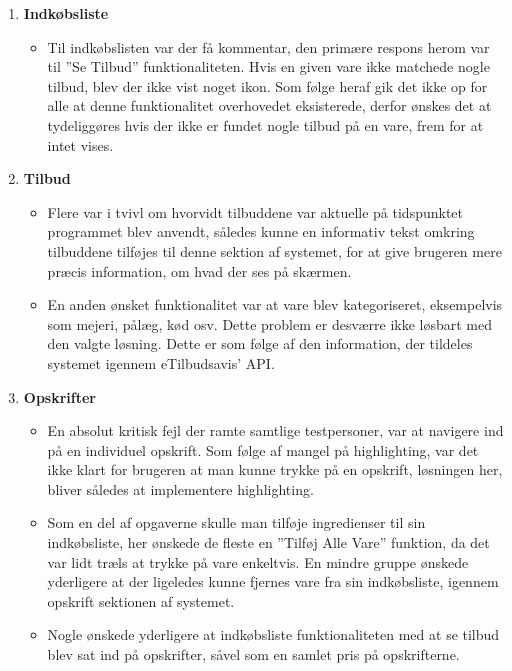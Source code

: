 \begin{enumerate}
   \item \textbf{Indkøbsliste} \begin{itemize}
   								  \item Til indkøbslisten var der få kommentar, den primære respons herom var til ''Se Tilbud'' funktionaliteten. Hvis en given vare ikke matchede nogle tilbud, blev der ikke vist noget ikon. Som følge heraf gik det ikke op for alle at denne funktionalitet overhovedet eksisterede, derfor ønskes det at tydeliggøres hvis der ikke er fundet nogle tilbud på en vare, frem for at intet vises.
   							   \end{itemize}
   \item \textbf{Tilbud}\begin{itemize}
   								  \item Flere var i tvivl om hvorvidt tilbuddene var aktuelle på tidspunktet programmet blev anvendt, således kunne en informativ tekst omkring tilbuddene tilføjes til denne sektion af systemet, for at give brugeren mere præcis information, om hvad der ses på skærmen.
   								  \item En anden ønsket funktionalitet var at vare blev kategoriseret, eksempelvis som mejeri, pålæg, kød osv. Dette problem er desværre ikke løsbart med den valgte løsning.
   								  Dette er som følge af den information, der tildeles systemet igennem eTilbudsavis' API.
   							   \end{itemize}
   \item \textbf{Opskrifter}\begin{itemize}
   								  \item En absolut kritisk fejl der ramte samtlige testpersoner, var at navigere ind på en individuel opskrift. Som følge af mangel på highlighting, var det ikke klart for brugeren at man kunne trykke på en opskrift, løsningen her, bliver således at implementere highlighting.
   								  \item Som en del af opgaverne skulle man tilføje ingredienser til sin indkøbsliste, her ønskede de fleste en ''Tilføj Alle Vare'' funktion, da det var lidt træls at trykke på vare enkeltvis.
   								  En mindre gruppe ønskede yderligere at der ligeledes kunne fjernes vare fra sin indkøbsliste, igennem opskrift sektionen af systemet.
   								  \item Nogle ønskede yderligere at indkøbsliste funktionaliteten med at se tilbud blev sat ind på opskrifter, såvel som en samlet pris på opskrifterne.

\end{itemize}
\end{enumerate}
